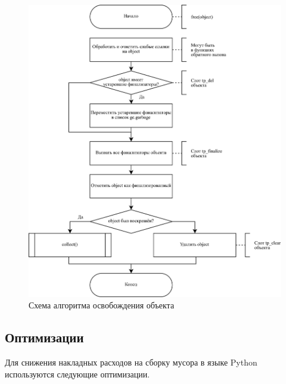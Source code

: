 \begin{figure}[H]
	\centering
	\includegraphics[scale=0.175]{assets/python-free.png}
	\caption{Схема алгоритма освобождения объекта}
	\label{fig:python-free}
\end{figure}



\subsection{Оптимизации}

Для снижения накладных расходов на сборку мусора в языке Python используются следующие оптимизации.

